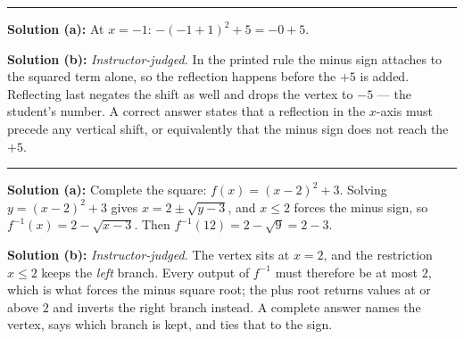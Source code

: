\documentclass[12pt]{article}
\begin{document}
\vspace{0.1cm}\noindent\rule{\linewidth}{0.2pt}


\textbf{Solution (a):} At $x = -1$: $-(-1 + 1)^{2} + 5 = -0 + 5$. 

\textbf{Solution (b):} \emph{Instructor-judged.} In the printed rule the minus sign attaches to the squared term alone, so the reflection happens before the $+5$ is added. Reflecting last negates the shift as well and drops the vertex to $-5$ --- the student's number. A correct answer states that a reflection in the $x$-axis must precede any vertical shift, or equivalently that the minus sign does not reach the $+5$.

\vspace{0.1cm}\noindent\rule{\linewidth}{0.2pt}


\textbf{Solution (a):} Complete the square: $f(x) = (x-2)^{2} + 3$. Solving $y = (x-2)^{2} + 3$ gives $x = 2 \pm \sqrt{y - 3}$, and $x \leq 2$ forces the minus sign, so $f^{-1}(x) = 2 - \sqrt{x - 3}$. Then $f^{-1}(12) = 2 - \sqrt{9} = 2 - 3$. 

\textbf{Solution (b):} \emph{Instructor-judged.} The vertex sits at $x = 2$, and the restriction $x \leq 2$ keeps the \emph{left} branch. Every output of $f^{-1}$ must therefore be at most $2$, which is what forces the minus square root; the plus root returns values at or above $2$ and inverts the right branch instead. A complete answer names the vertex, says which branch is kept, and ties that to the sign.
\end{document}
